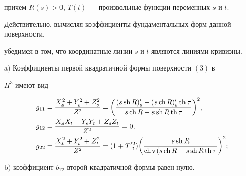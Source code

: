 причем $R(s)>0$, $T(t)$ --- произвольные функции переменных $s$ и $t$.





Действительно, вычисляя коэффициенты фундаментальных форм данной поверхности,


убедимся в том, что координатные линии $s$ и $t$ являются линиями кривизны.





\begin{lem}


$\mathrm a)$ Коэффициенты первой квадратичной формы поверхности $(3)$ в


$H^3$ имеют вид


\begin{align*}


g_{11}&=\frac{X_s^2+Y_s^2+Z_s^2}{Z^2}=\bigg(\frac{(s\sh R)'_s-


(s\ch R)'_s\th \tau}{s\ch R-s\sh R\th \tau} \bigg)^2,\\


g_{12}&=\frac{X_sX_t+Y_sY_t+Z_sZ_t}{Z^2}=0,\\


g_{22}&=\frac{X_t^2+Y_t^2+Z_t^2}{Z^2}=(1+T'{}_t^2)\bigg (\frac{s\sh R}


{\ch \tau (s\ch R-s\sh R\th \tau}\bigg)^2;


\end{align*}





$\mathrm b)$ коэффициент $b_{12}$ второй квадратичной формы равен нулю.


\end{lem}





